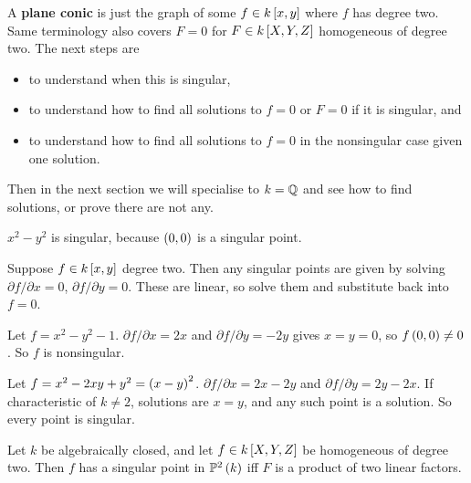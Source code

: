 
A \textbf{plane conic} is just the graph of some $ f \in k\sbr{x, y} $ where $ f $ has degree two. Same terminology also covers $ F = 0 $ for $ F \in k\sbr{X, Y, Z} $ homogeneous of degree two. The next steps are
\begin{itemize}
\item to understand when this is singular,
\item to understand how to find all solutions to $ f = 0 $ or $ F = 0 $ if it is singular, and
\item to understand how to find all solutions to $ f = 0 $ in the nonsingular case given one solution.
\end{itemize}
Then in the next section we will specialise to $ k = \mathbb{Q} $ and see how to find solutions, or prove there are not any.

\begin{example*}
$ x^2 - y^2 $ is singular, because $ \br{0, 0} $ is a singular point.
\end{example*}

\begin{algorithm}[Checking if $ f = 0 $ is singular]
Suppose $ f \in k\sbr{x, y} $ degree two. Then any singular points are given by solving $ \partial f / \partial x = 0 $, $ \partial f / \partial y = 0 $. These are linear, so solve them and substitute back into $ f = 0 $.
\end{algorithm}

\begin{example*}
Let $ f = x^2 - y^2 - 1 $. $ \partial f / \partial x = 2x $ and $ \partial f / \partial y = -2y $ gives $ x = y = 0 $, so $ f\br{0, 0} \ne 0 $. So $ f $ is nonsingular.
\end{example*}

\begin{example*}
Let $ f = x^2 - 2xy + y^2 = \br{x - y}^2 $. $ \partial f / \partial x = 2x - 2y $ and $ \partial f / \partial y = 2y - 2x $. If characteristic of $ k \ne 2 $, solutions are $ x = y $, and any such point is a solution. So every point is singular.
\end{example*}

\begin{theorem}
Let $ k $ be algebraically closed, and let $ f \in k\sbr{X, Y, Z} $ be homogeneous of degree two. Then $ f $ has a singular point in $ \P^2\br{k} $ iff $ F $ is a product of two linear factors.
\end{theorem}

